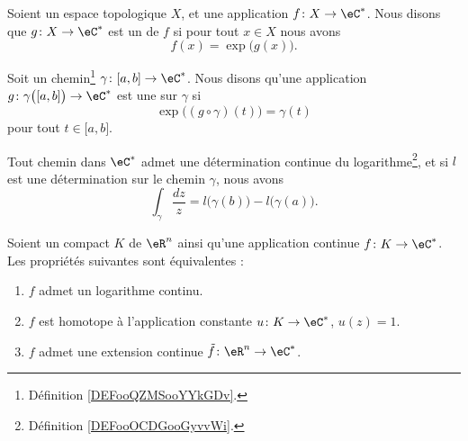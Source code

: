\begin{definition}
    Soient un espace topologique \( X\), et une application \( f\colon X\to \eC^*\). Nous disons que \( g\colon X\to \eC^*\) est un  de \( f\) si pour tout \( x\in X\) nous avons
    \begin{equation}
        f(x)=\exp\big( g(x) \big).
    \end{equation}
\end{definition}

\begin{definition}     \label{DEFooOCDGooGyvvWi}
    Soit un chemin\footnote{Définition \ref{DEFooQZMSooYYkGDv}.} \( \gamma\colon \mathopen[ a , b \mathclose]\to \eC^*\). Nous disons qu'une application \( g\colon \gamma\big( \mathopen[ a , b \mathclose] \big)\to \eC^*\) est une  sur \( \gamma\) si
    \begin{equation}
        \exp\big( (g\circ\gamma)(t) \big)=\gamma(t)
    \end{equation}
    pour tout \( t\in \mathopen[ a , b \mathclose]\).
\end{definition}

\begin{theorem}     \label{THOooUPANooMiECqe}
    Tout chemin dans \( \eC^*\) admet une détermination continue du logarithme\footnote{Définition \ref{DEFooOCDGooGyvvWi}.}, et si \( l\) est une détermination sur le chemin \( \gamma\), nous avons
    \begin{equation}
        \int_{\gamma}\frac{ dz }{ z }=l\big( \gamma(b) \big)-l\big( \gamma(a) \big).
    \end{equation}
\end{theorem}

\begin{theorem}     \label{THOooTCUMooEByCKg}
    Soient un compact \( K\) de \( \eR^n\) ainsi qu'une application continue \( f\colon K\to \eC^*\). Les propriétés suivantes sont équivalentes :
    \begin{enumerate}
        \item   \label{ITEMooKZYDooKoEEbl}
            \( f\) admet un logarithme continu.
        \item   \label{ITEMooXVNXooVAHklr}
            \( f\) est homotope à l'application constante \( u\colon K\to \eC^*\), \( u(z)=1\).
        \item   \label{ITEMooQDHXooObjxLA}
            \( f\) admet une extension continue \( \tilde f\colon \eR^n\to \eC^*\).
    \end{enumerate}
\end{theorem}

